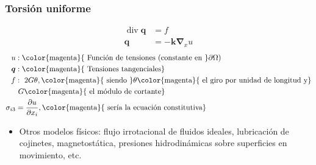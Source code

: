 \documentclass[handout]{beamer}
\begin{document}
\begin{frame}
\frametitle{Torsión uniforme}
\begin{align*}
\operatorname{div} \bm{q}&=f  \\
\bm{q}&=-\bm{k} \bm{\nabla}_{x} u
\end{align*}
\begin{align*}
u  &:\textrm{\color{magenta}{ Función de tensiones (constante en }} \partial \Omega) \\
\bm{q}&:\textrm{\color{magenta}{ Tensiones tangenciales}} \\
f&: \textrm{ }2 G \theta, \textrm{\color{magenta}{ siendo }} 
\theta \textrm{\color{magenta}{ el giro por unidad de longitud y}} \\
 &\mbox{ }G \textrm{\color{magenta}{ el módulo de cortante}} \\
\sigma_{i3}&= \frac{\partial u}{\partial x_i}, 
\textrm{\color{magenta}{ sería la ecuación constitutiva}}
\end{align*}
\begin{itemize}
\item Otros modelos físicos: flujo irrotacional de fluidos ideales,
lubricación de cojinetes, magnetostática, presiones hidrodinámicas sobre
superficies en movimiento, etc.
\end{itemize}
\end{frame}
\end{document}
